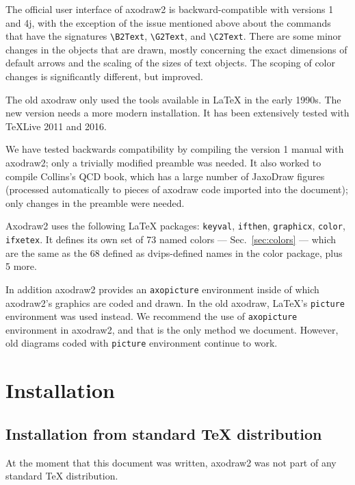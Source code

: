 \documentclass[12pt]{article}
\def\program#1{\texttt{#1}}
\begin{document}
The official user interface of axodraw2 is backward-compatible with
versions 1 and 4j, with the exception of the issue mentioned above
about the commands that have the signatures \verb+\B2Text+,
\verb+\G2Text+, and \verb+\C2Text+.  There are some minor changes in
the objects that are drawn, mostly concerning the exact dimensions of
default arrows and the scaling of the sizes of text objects.  The
scoping of color changes is significantly different, but improved.

The old axodraw only used the tools available in \LaTeX{} in the early
1990s.  The new version needs a more modern installation.  It has been
extensively tested with TeXLive 2011 and 2016.

We have tested backwards compatibility by compiling the version 1
manual with axodraw2; only a trivially modified preamble was needed.
It also worked to compile Collins's QCD book\cite{qcdbook},
which has a large number
of JaxoDraw figures (processed automatically to pieces of axodraw code
imported into the document); only changes in the preamble were needed.

Axodraw2 uses the following \LaTeX{} packages: \program{keyval},
\program{ifthen}, \program{graphicx}, \program{color}, \program{ifxetex}. 
It defines its own set of 73 named colors --- Sec.\ \ref{sec:colors}
--- which are the same as the 68 defined as dvips-defined names in the
color package, plus 5 more.

In addition axodraw2 provides an \verb+axopicture+ environment
inside of which axodraw2's graphics are coded and drawn.  In the old
axodraw, \LaTeX's \verb+picture+ environment was used instead.  We
recommend the use of \verb+axopicture+ environment in axodraw2, and
that is the only method we document.  However, old diagrams coded with
\verb+picture+ environment continue to work.


\section{Installation}
\label{sec:installation}

\subsection{Installation from standard \TeX{} distribution}

At the moment that this document was written, axodraw2 was not part of any
standard \TeX{} distribution.
\end{document}
